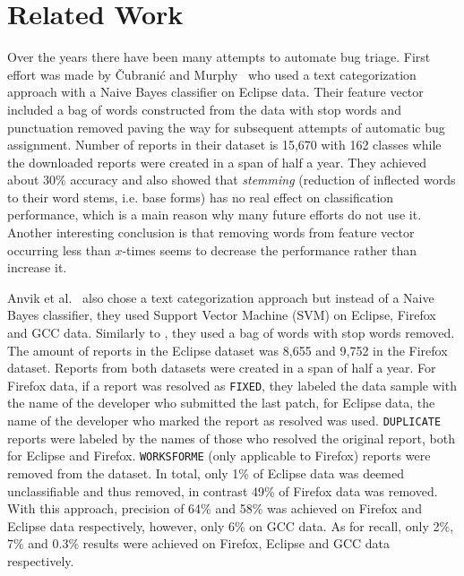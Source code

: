 \chapter{Related Work}
\label{chapter:related-work}

Over the years there have been many attempts to automate bug triage. First effort was made by Čubranić and Murphy~\cite{Murphy} who used a text categorization approach with a Naive Bayes classifier on Eclipse data. Their feature vector included a bag of words constructed from the data with stop words and punctuation removed paving the way for subsequent attempts of automatic bug assignment. Number of reports in their dataset is 15,670 with 162 classes while the downloaded reports were created in a span of half a year. They achieved about 30\% accuracy and also showed that \textit{stemming} (reduction of inflected words to their word stems, i.e. base forms) has no real effect on classification performance, which is a main reason why many future efforts do not use it. Another interesting conclusion is that removing words from feature vector occurring less than $x$-times seems to decrease the performance rather than increase it.

Anvik et al.~\cite{Anvik2006} also chose a text categorization approach but instead of a Naive Bayes classifier, they used Support Vector Machine (SVM) on Eclipse, Firefox and GCC data. Similarly to \cite{Murphy}, they used a bag of words with stop words removed. The amount of reports in the Eclipse dataset was 8,655 and 9,752 in the Firefox dataset. Reports from both datasets were created in a span of half a year. For Firefox data, if a report was resolved as \texttt{FIXED}, they labeled the data sample with the name of the developer who submitted the last patch, for Eclipse data, the name of the developer who marked the report as resolved was used. \texttt{DUPLICATE} reports were labeled by the names of those who resolved the original report, both for Eclipse and Firefox. \texttt{WORKSFORME} (only applicable to Firefox) reports were removed from the dataset. In total, only 1\% of Eclipse data was deemed unclassifiable and thus removed, in contrast 49\% of Firefox data was removed. With this approach, precision of 64\% and 58\% was achieved on Firefox and Eclipse data respectively, however, only 6\% on GCC data. As for recall, only 2\%, 7\% and 0.3\% results were achieved on Firefox, Eclipse and GCC data respectively.

